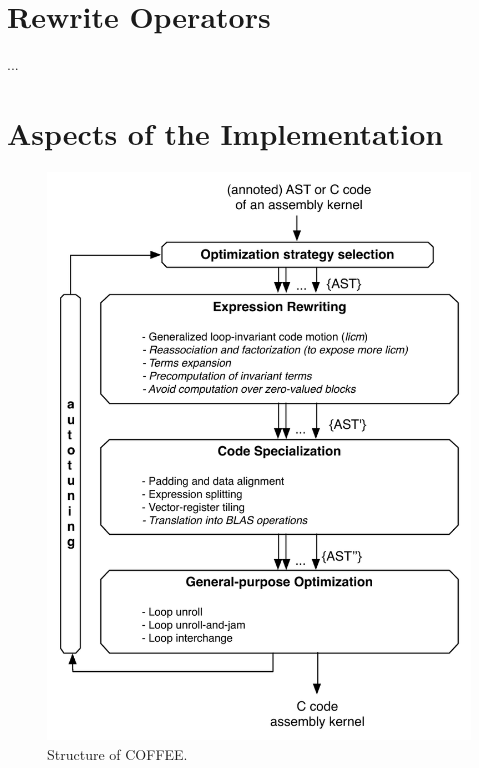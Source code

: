 \section{Rewrite Operators}
\label{sec:coffee:rewrite-ops}
...

\section{Aspects of the Implementation}

\begin{figure}
\begin{center}
\includegraphics[scale=0.70]{coffee/pictures/coffee-scheme.pdf}
\caption{Structure of COFFEE.}
\label{fig:coffee-compiler-structure}
\end{center}
\end{figure}

